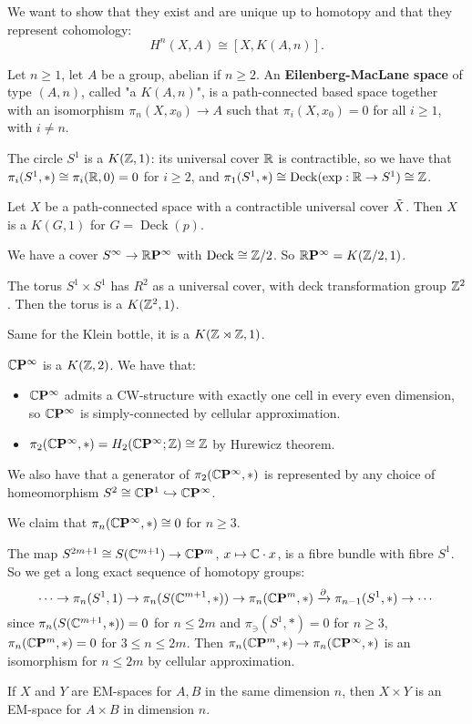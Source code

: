 We want to show that they exist and are unique up to homotopy and that they represent cohomology:
\[H^n(X,A)\cong[X,K(A,n)].\]

Let $n\geq1$, let $A$ be a group, abelian if $n\geq2$.
An \textbf{Eilenberg-MacLane space} of type $(A,n)$, called "a $K(A,n)$", is a path-connected based space together with an isomorphism $\pi_n(X,x_0)\to A$ such that $\pi_i(X,x_0)=0$ for all $i\geq1$, with $i\neq n$.

\begin{examples}
The circle $S^1$ is a $K({\mathbb Z},1)$: its universal cover ${\mathbb R}$ is contractible, so we have that $\pi_i(S^1,*)\cong\pi_i({\mathbb R},0)=0$ for $i\geq2$, and $\pi_1(S^1,*)\cong\operatorname{Deck}(\operatorname{exp}:{\mathbb R}\to S^1)\cong{\mathbb Z}$.

Let $X$ be a path-connected space with a contractible universal cover $\tilde X$. Then $X$ is a $K(G,1)$ for $G=\operatorname{Deck}(p)$.

We have a cover $S^\infty\to{{\mathbb R}\mathbf{P}^{\infty}}$ with $\operatorname{Deck}\cong{\mathbb Z}/2$. So ${{\mathbb R}\mathbf{P}^{\infty}}=K({\mathbb Z}/2,1)$.

The torus $S^1\times S^1$ has $R^2$ as a universal cover, with deck transformation group ${\mathbb Z}^2$. Then the torus is a $K({\mathbb Z}^2,1)$.

Same for the Klein bottle, it is a $K({\mathbb Z}\rtimes{\mathbb Z},1)$.
\end{examples}

\begin{example}
${\mathbb{C}\mathbf{P}^{\infty}}$ is a $K({\mathbb Z},2)$. We have that:
\begin{itemize}[label={-}]
    \item ${\mathbb{C}\mathbf{P}^{\infty}}$ admits a CW-structure with exactly one cell in every even dimension, so ${\mathbb{C}\mathbf{P}^{\infty}}$ is simply-connected by cellular approximation.
    \item $\pi_2({\mathbb{C}\mathbf{P}^{\infty}},*)=H_2({\mathbb{C}\mathbf{P}^{\infty}};{\mathbb Z})\cong{\mathbb Z}$ by Hurewicz theorem.
\end{itemize}
We also have that a generator of $\pi_2({\mathbb{C}\mathbf{P}^{\infty}},*)$ is represented by any choice of homeomorphism $S^2\cong{\mathbb{C}\mathbf{P}^{1}}\hookrightarrow{\mathbb{C}\mathbf{P}^{\infty}}$.

We claim that $\pi_n({\mathbb{C}\mathbf{P}^{\infty}},*)\cong0$ for $n\geq3$.

The map $S^{2m+1}\cong S(\mathbb{C}^{m+1})\to{\mathbb{C}\mathbf{P}^{m}}$, $x\mapsto\mathbb{C}\cdot x$, is a fibre bundle with fibre $S^1$. So we get a long exact sequence of homotopy groups:
\[\cdots\to\pi_n(S^1,1)\to\pi_n(S(\mathbb{C}^{m+1},*))\to\pi_n({\mathbb{C}\mathbf{P}^{m}},*)\xrightarrow{\partial}\pi_{n-1}(S^1,*)\to\cdots\]
since $\pi_n(S(\mathbb{C}^{m+1},*))=0$ for $n\leq2m$ and $\pi_\ni(S^1,*)=0$ for $n\geq3$, $\pi_n({\mathbb{C}\mathbf{P}^{m}},*)=0$ for $3\leq n\leq 2m$. Then $\pi_n({\mathbb{C}\mathbf{P}^{m}},*)\to\pi_n({\mathbb{C}\mathbf{P}^{\infty}},*)$ is an isomorphism for $n\leq2m$ by cellular approximation.
\end{example}

\begin{example}
If $X$ and $Y$ are EM-spaces for $A,B$ in the same dimension $n$, then $X\times Y$ is an EM-space for $A\times B$ in dimension $n$.
\end{example}
